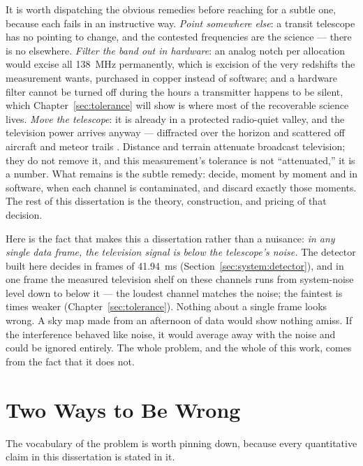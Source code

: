 It is worth dispatching the obvious remedies before reaching for a subtle one, because each fails in an instructive way. \emph{Point somewhere else}: a transit telescope has no pointing to change, and the contested frequencies are the science --- there is no elsewhere. \emph{Filter the band out in hardware}: an analog notch per allocation would excise all 138~MHz permanently, which is excision of the very redshifts the measurement wants, purchased in copper instead of software; and a hardware filter cannot be turned off during the hours a transmitter happens to be silent, which Chapter~\ref{sec:tolerance} will show is where most of the recoverable science lives. \emph{Move the telescope}: it is already in a protected radio-quiet valley, and the television power arrives anyway --- diffracted over the horizon and scattered off aircraft and meteor trails \cite{amiri2022chime}. Distance and terrain attenuate broadcast television; they do not remove it, and this measurement's tolerance is not ``attenuated,'' it is a number. What remains is the subtle remedy: decide, moment by moment and in software, when each channel is contaminated, and discard exactly those moments. The rest of this dissertation is the theory, construction, and pricing of that decision.

Here is the fact that makes this a dissertation rather than a nuisance: \emph{in any single data frame, the television signal is below the telescope's noise.} The detector built here decides in frames of 41.94~ms (Section~\ref{sec:system:detector}), and in one frame the measured television shelf on these channels runs from system-noise level down to  below it --- the loudest channel matches the noise; the faintest is  times weaker (Chapter~\ref{sec:tolerance}). Nothing about a single frame looks wrong. A sky map made from an afternoon of data would show nothing amiss. If the interference behaved like noise, it would average away with the noise and could be ignored entirely. The whole problem, and the whole of this work, comes from the fact that it does not.

\section{Two Ways to Be Wrong}
\label{sec:intro:errors}

The vocabulary of the problem is worth pinning down, because every quantitative claim in this dissertation is stated in it.

